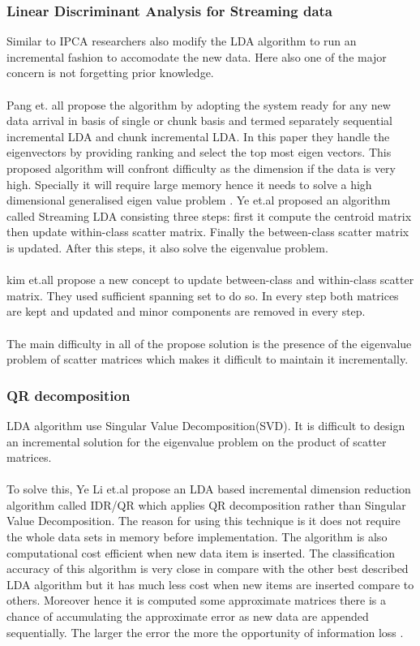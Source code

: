 \subsubsection{Linear Discriminant Analysis for Streaming data}
Similar to IPCA researchers also modify the LDA algorithm to run an incremental fashion to accomodate the new data. Here also one of the major concern is not forgetting prior knowledge.\\\\
Pang et. all \cite{1thesis2} propose the algorithm by adopting the system ready for any new data arrival in basis of single or chunk basis and termed separately sequential incremental LDA and chunk incremental LDA. In this paper they handle the eigenvectors by providing ranking and select the top most eigen vectors. This proposed algorithm will confront difficulty as the dimension if the data is very high. Specially it will require large memory hence it needs to solve a high dimensional generalised eigen value problem \cite{thesis3}.
Ye et.al \cite{thesis3} proposed an algorithm called Streaming LDA consisting three steps: first it compute the centroid matrix then update within-class scatter matrix. Finally the between-class scatter matrix is updated. After this steps, it also solve the eigenvalue problem.\\\\
kim et.all \cite{p317} propose a new concept to update between-class and within-class scatter matrix. They used sufficient spanning set to do so. In every step both matrices are kept and updated and minor components are removed in every step.\\\\
The main difficulty in all of the propose solution is the presence of the eigenvalue problem of scatter matrices which makes it difficult to maintain it incrementally. 
\subsubsection{QR decomposition}
LDA algorithm use Singular Value Decomposition(SVD). It is difficult to design an incremental solution for the eigenvalue problem on the product of scatter matrices.\\\\
To solve this, Ye Li et.al \cite{thesis2} propose an LDA based incremental dimension reduction algorithm called IDR/QR which applies QR decomposition rather than Singular Value Decomposition. The reason for using this technique is it does not require the whole data sets in memory before implementation. The algorithm is also computational cost efficient when new data item is inserted. The classification accuracy of this algorithm is very close in compare with the other best described LDA algorithm but it has much less cost when new items are inserted compare to others. Moreover hence it is computed some approximate matrices there is a chance of accumulating the approximate error as new data are appended sequentially. The larger the error the more the opportunity of information loss \cite{thesis3}.
